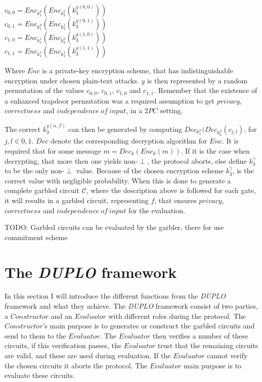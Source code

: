 \documentclass[twoside,11pt,openright]{report}
\newcommand{\todo}[1]{}
\renewcommand{\todo}[1]{{\color{red} TODO: {#1}} \\}
\newcommand{\DUPLO}{\textit{DUPLO} }
\begin{document}
\begin{center}
    $c_{0,0} = Enc_{k^0_1}(Enc_{k^0_2}(k^{g(0,0)}_3))$    \\
    $c_{0,1} = Enc_{k^0_1}(Enc_{k^1_2}(k^{g(0,1)}_3))$    \\
    $c_{1,0} = Enc_{k^1_1}(Enc_{k^0_2}(k^{g(1,0)}_3))$    \\
    $c_{1,1} = Enc_{k^1_1}(Enc_{k^1_2}(k^{g(1,1)}_3))$    \\
\end{center}

Where $Enc$ is a private-key encryption scheme, that has indistinguishable encryption under chosen plain-text attacks. $g$ is then represented by a random permutation of the values $c_{0,0}$, $c_{0,1}$, $c_{1,0}$ and $c_{1,1}$. Remember that the existence of a enhanced trapdoor permutation was a required assumption to get $privacy$, $correctness$ and $independence~of~input$, in a $2PC$ setting.

The correct $k^{g(\alpha,\beta)}_3$ can then be generated by computing $Dec_{k^\alpha_1}(Dec_{k^\beta_2}(c_{j,l})$, for $j,l\in{0,1}$. $Dec$ denote the corresponding decryption algorithm for $Enc$. It is required that for some message $m=Dec_k(Enc_k(m))$. If it is the case when decrypting, that more then one yields non-$\perp$, the protocol aborts, else define $k^\gamma_3$ to be the only non-$\perp$ value. Because of the chosen encryption scheme $k^\gamma_3$, is the correct value with negligible probability. When this is done to generate a complete garbled circuit $\mathcal{C}$, where the description above is followed for each gate, it will results in a garbled circuit, representing $f$, that ensures $privacy$, $correctness$ and $independence ~of~input$ for the evaluation.

\todo{Garbled circuits can be evaluated by the garbler, there for use commitment scheme}


\section{The \DUPLO framework}
\label{sec:duplo_framework}
In this section I will introduce the different functions from the \DUPLO framework and what they achieve. The \DUPLO framework consist of two parties, a $Constructor$ and an $Evaluator$ with different roles during the protocol. The $Constructor$'s main purpose is to generates or construct the garbled circuits and send to them to the $Evaluator$. The $Evaluator$ then verifies a number of these circuits, if this verification passes, the $Evaluator$ trust that the remaining circuits are valid, and these are used during evaluation. If the $Evaluator$ cannot verify the chosen circuits it aborts the protocol. The $Evaluator$ main purpose is to evaluate these circuits.
\end{document}

